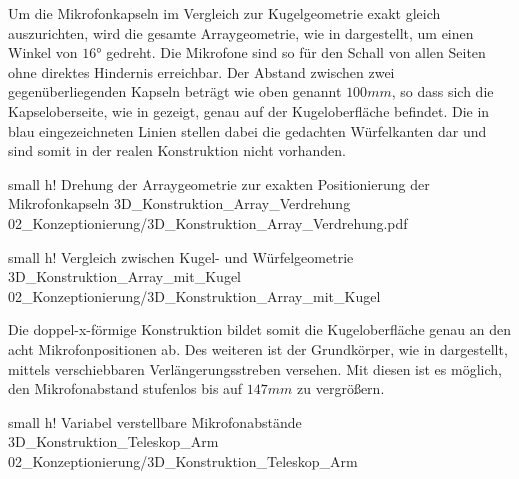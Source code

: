Um die Mikrofonkapseln im Vergleich zur Kugelgeometrie exakt gleich auszurichten, wird die gesamte Arraygeometrie, wie in  dargestellt, um einen Winkel von $16°$ gedreht. Die Mikrofone sind so für den Schall von allen Seiten ohne direktes Hindernis erreichbar. Der Abstand zwischen zwei gegenüberliegenden Kapseln beträgt wie oben genannt $100mm$, so dass sich die Kapseloberseite, wie in  gezeigt, genau auf der Kugeloberfläche befindet. Die in blau eingezeichneten Linien stellen dabei die gedachten Würfelkanten dar und sind somit in der realen Konstruktion nicht vorhanden.


         {small}                 %
         {h!}             %
         {Drehung der Arraygeometrie zur exakten Positionierung der Mikrofonkapseln}                %
         {3D_Konstruktion_Array_Verdrehung}                %
         {02_Konzeptionierung/3D_Konstruktion_Array_Verdrehung.pdf}     %


         {small}                 %
         {h!}             %
         {Vergleich zwischen Kugel- und Würfelgeometrie}                %
         {3D_Konstruktion_Array_mit_Kugel}                %
         {02_Konzeptionierung/3D_Konstruktion_Array_mit_Kugel}     %


Die doppel-x-förmige Konstruktion bildet somit die Kugeloberfläche genau an den acht Mikrofonpositionen ab. Des weiteren ist der Grundkörper, wie in  dargestellt, mittels verschiebbaren Verlängerungsstreben versehen. Mit diesen ist es möglich, den Mikrofonabstand stufenlos bis auf $147mm$ zu vergrößern.




         {small}                 %
         {h!}             %
         {Variabel verstellbare Mikrofonabstände}                %
         {3D_Konstruktion_Teleskop_Arm}                %
         {02_Konzeptionierung/3D_Konstruktion_Teleskop_Arm}     %



